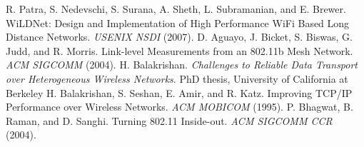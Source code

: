 \documentclass[twocolumn,11pt,twoside]{article}
\begin{document}
\begin{thebibliography}{9}
     R. Patra, S. Nedevschi, S. Surana, A. Sheth, L. Subramanian, and E. Brewer. WiLDNet: Design and Implementation of High Performance WiFi Based Long Distance Networks. \emph{USENIX NSDI} (2007).
     D. Aguayo, J. Bicket, S. Biswas, G. Judd, and R. Morris. Link-level Measurements from an 802.11b Mesh Network. \emph{ACM SIGCOMM} (2004).
     H. Balakrishan. \emph{Challenges to Reliable Data Transport over Heterogeneous Wireless Networks}. PhD thesis, University of California at Berkeley
     H. Balakrishan, S. Seshan, E. Amir, and R. Katz. Improving TCP/IP Performance over Wireless Networks. \emph{ACM MOBICOM} (1995).
     P. Bhagwat, B. Raman, and D. Sanghi. Turning 802.11 Inside-out. \emph{ACM SIGCOMM CCR} (2004).
\end{thebibliography}

\end{document}
